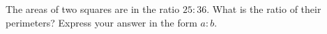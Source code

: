 The areas of two squares are in the ratio $25:36$. What is the ratio of their perimeters? Express your answer in the form $a:b$.
